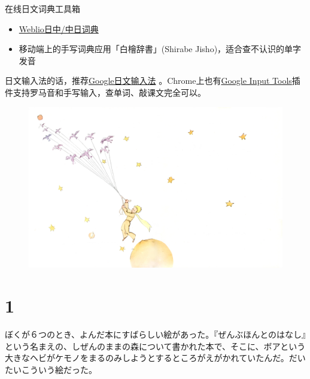 \documentclass{tufte-handout}
\begin{document}
    \parStar 在线日文词典工具箱
    \begin{itemize}
        \setlength\itemsep{0.5em}
        
        \item \href{https://cjjc.weblio.jp/}{Weblio日中/中日词典}
        
        \item 移动端上的手写词典应用「白檜辞書」(Shirabe Jisho)，适合查不认识的单字发音
    \end{itemize}
    
    \parStar 日文输入法的话，推荐\href{https://www.google.co.jp/ime/}{Google日文输入法} 。Chrome上也有\href{https://chrome.google.com/webstore/detail/google-input-tools/mclkkofklkfljcocdinagocijmpgbhab/related}{Google Input Tools}插件支持罗马音和手写输入，查单词、敲课文完全可以。

\begin{figure}
    \centering
    \includegraphics[width=1.5\textwidth]{fig46817_01.png}
\end{figure}

\newpage
{}
\setcounter{page}{1}

\fancyhf{} %
\fancyhead[LE,RO]{\leftmark}
\fancyfoot[C]{\thepage}

\section{1}
ぼくが６つのとき、よんだ本にすばらしい絵があった。『ぜんぶほんとのはなし』という名まえの、しぜんのままの森について書かれた本で、そこに、ボアという大きなヘビがケモノをまるのみしようとするところがえがかれていたんだ。だいたいこういう絵だった。
\end{document}
